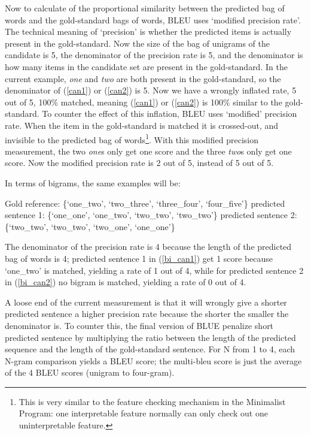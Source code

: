 \documentclass[final]{ua-thesis}
\numberwithin{equation}{section}
\begin{document}
Now to calculate of the proportional similarity between the predicted bag of words and the gold-standard bags of words, BLEU uses `modified precision rate'. The technical meaning of `precision' is whether the predicted items is actually present in the gold-standard. Now the size of the bag of unigrams of the candidate is 5, the denominator of the precision rate is 5, and the denominator is how many items in the candidate set are present in the gold-standard. In the current example, \textit{one} and \textit{two} are both present in the gold-standard, so the denominator of (\ref{can1}) or (\ref{can2}) is 5. Now we have a wrongly inflated rate, 5 out of 5, 100$\%$ matched, meaning (\ref{can1}) or (\ref{can2}) is 100$\%$ similar to the gold-standard. To counter the effect of this inflation, BLEU uses `modified' precision rate. When the item in the gold-standard is matched it is crossed-out, and invisible to the predicted bag of words\footnote{This is very similar to the feature checking mechanism in the Minimalist Program: one interpretable feature normally can only check out one uninterpretable feature.}. With this modified precision measurement, the two \textit{one}s only get one score and the three \textit{two}s only get one score. Now the modified precision rate is 2 out of 5, instead of 5 out of 5. 

In terms of bigrams, the same examples will be:

\begin{exe}
\ex 
	\begin{xlist}
	\ex \label{bi_gold1} Gold reference: \{`one\_two',  `two\_three', `three\_four', `four\_five'\}
	\ex \label{bi_can1} predicted sentence 1: \{`one\_one',  `one\_two', `two\_two', `two\_two'\}
	\ex \label{bi_can2} predicted sentence 2: \{`two\_two', `two\_two', `two\_one', `one\_one'\}
	\end{xlist}
\end{exe}

The denominator of the precision rate is 4 because the length of the predicted bag of words is 4; predicted sentence 1 in (\ref{bi_can1}) get 1 score because `one\_two' is matched, yielding a rate of 1 out of 4, while for predicted sentence 2 in (\ref{bi_can2}) no bigram is matched, yielding a rate of 0 out of 4. 

A loose end of the current measurement is that it will wrongly give a shorter predicted sentence a higher precision rate because the shorter the smaller the denominator is. To counter this, the final version of BLUE penalize short predicted sentence by multiplying the ratio between the length of the predicted sequence and the length of the gold-standard sentence. For N from 1 to 4, each N-gram comparison yields a BLEU score; the multi-bleu score is just the average of the 4 BLEU scores (unigram to four-gram). 
\end{document}

